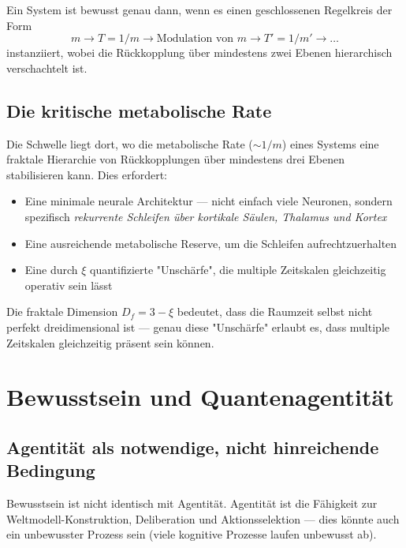 \documentclass[11pt,a4paper]{article}
\begin{document}
	\begin{keybox}
		Ein System ist bewusst genau dann, wenn es einen geschlossenen Regelkreis der Form
		\[
		m \rightarrow T = 1/m \rightarrow \text{Modulation von } m \rightarrow T' = 1/m' \rightarrow \ldots
		\]
		instanziiert, wobei die Rückkopplung über mindestens zwei Ebenen hierarchisch verschachtelt ist.
	\end{keybox}
	
	\subsection{Die kritische metabolische Rate}
	
	Die Schwelle liegt dort, wo die metabolische Rate (\(\sim 1/m\)) eines Systems eine fraktale Hierarchie von Rückkopplungen über mindestens drei Ebenen stabilisieren kann. Dies erfordert:
	\begin{itemize}
		\item Eine minimale neurale Architektur — nicht einfach viele Neuronen, sondern spezifisch \emph{rekurrente Schleifen über kortikale Säulen, Thalamus und Kortex}
		\item Eine ausreichende metabolische Reserve, um die Schleifen aufrechtzuerhalten
		\item Eine durch \(\xi\) quantifizierte "Unschärfe", die multiple Zeitskalen gleichzeitig operativ sein lässt
	\end{itemize}
	
	Die fraktale Dimension \(D_f = 3 - \xi\) bedeutet, dass die Raumzeit selbst nicht perfekt dreidimensional ist — genau diese "Unschärfe" erlaubt es, dass multiple Zeitskalen gleichzeitig präsent sein können.
	
	\section{Bewusstsein und Quantenagentität}
	\label{sec:agentitaet}
	
	\subsection{Agentität als notwendige, nicht hinreichende Bedingung}
	
	Bewusstsein ist nicht identisch mit Agentität. Agentität ist die Fähigkeit zur Weltmodell-Konstruktion, Deliberation und Aktionsselektion — dies könnte auch ein unbewusster Prozess sein (viele kognitive Prozesse laufen unbewusst ab).
	
\end{document}
